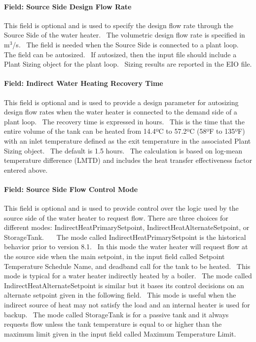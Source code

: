\paragraph{Field: Source Side Design Flow Rate}\label{field-source-side-design-flow-rate-000}

This field is optional and is used to specify the design flow rate through the Source Side of the water heater.~ The volumetric design flow rate is specified in m\(^{3}\)/s.~ The field is needed when the Source Side is connected to a plant loop.~ The field can be autosized.~ If autosized, then the input file should include a Plant Sizing object for the plant loop.~ Sizing results are reported in the EIO file.

\paragraph{Field: Indirect Water Heating Recovery Time}\label{field-indirect-water-heating-recovery-time}

This field is optional and is used to provide a design parameter for autosizing design flow rates when the water heater is connected to the demand side of a plant loop.~ The recovery time is expressed in hours.~ This is the time that the entire volume of the tank can be heated from 14.4ºC to 57.2ºC (58ºF to 135ºF) with an inlet temperature defined as the exit temperature in the associated Plant Sizing object.~ The default is 1.5 hours.~ The calculation is based on log-mean temperature difference (LMTD) and includes the heat transfer effectiveness factor entered above.

\paragraph{Field: Source Side Flow Control Mode}\label{field-source-side-flow-control-mode}

This field is optional and is used to provide control over the logic used by the source side of the water heater to request flow. There are three choices for different modes: IndirectHeatPrimarySetpoint, IndirectHeatAlternateSetpoint, or StorageTank.~~~ The mode called IndirectHeatPrimarySetpoint is the historical behavior prior to version 8.1.~ In this mode the water heater will request flow at the source side when the main setpoint, in the input field called Setpoint Temperature Schedule Name, and deadband call for the tank to be heated.~ This mode is typical for a water heater indirectly heated by a boiler.~ The mode called IndirectHeatAlternateSetpoint is similar but it bases its control decisions on an alternate setpoint given in the following field.~ This mode is useful when the indirect source of heat may not satisfy the load and an internal heater is used for backup.~ The mode called StorageTank is for a passive tank and it always requests flow unless the tank temperature is equal to or higher than the maximum limit given in the input field called Maximum Temperature Limit.

